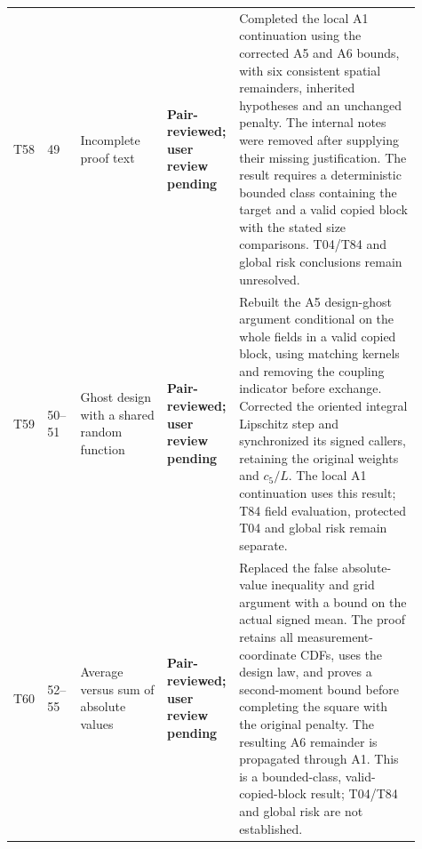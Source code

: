 \documentclass[10pt]{article}
\newcommand{\deferred}{\textcolor{deferredred}{\textbf{Deferred}}}
\newcommand{\pairreviewed}{\textcolor{deferredred}{\textbf{Pair-reviewed; user review pending}}}
\begin{document}
\begin{landscape}
\begin{longtable}{L{0.045\linewidth}L{0.08\linewidth}L{0.21\linewidth}L{0.13\linewidth}L{0.445\linewidth}}
T58 & 49 & Incomplete proof text & \pairreviewed &
\textcolor{deferredred}{Completed the local A1 continuation using the
corrected A5 and A6 bounds, with six consistent spatial remainders,
inherited hypotheses and an unchanged penalty. The internal notes were
removed after supplying their missing justification. The result requires
a deterministic bounded class containing the target and a valid copied
block with the stated size comparisons. T04/T84 and global risk conclusions
remain unresolved.}\\
T59 & 50--51 & Ghost design with a shared random function & \pairreviewed &
\textcolor{deferredred}{Rebuilt the A5 design-ghost argument conditional
on the whole fields in a valid copied block, using matching kernels and
removing the coupling indicator before exchange. Corrected the oriented
integral Lipschitz step and synchronized its signed callers, retaining
the original weights and $c_5/L$. The local A1 continuation uses this
result; T84 field evaluation, protected T04 and global risk remain separate.}\\
T60 & 52--55 & Average versus sum of absolute values &
\pairreviewed & \textcolor{deferredred}{Replaced the false absolute-value
inequality and grid argument with a bound on the actual signed mean.
The proof retains all measurement-coordinate CDFs, uses the design law,
and proves a second-moment bound before completing the square with the
original penalty. The resulting A6 remainder is propagated through A1.
This is a bounded-class, valid-copied-block result; T04/T84 and global
risk are not established.}\\

\end{longtable}
\end{landscape}
\end{document}
